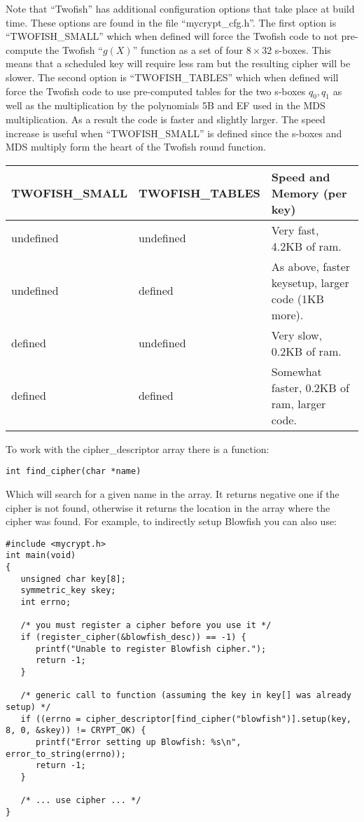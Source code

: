 \documentclass{book}
\begin{document}
Note that ``Twofish'' has additional configuration options that take place at build time.  These options are found in
the file ``mycrypt\_cfg.h''.  The first option is ``TWOFISH\_SMALL'' which when defined will force the Twofish code
to not pre-compute the Twofish ``$g(X)$'' function as a set of four $8 \times 32$ s-boxes.  This means that a scheduled
key will require less ram but the resulting cipher will be slower.  The second option is ``TWOFISH\_TABLES'' which when
defined will force the Twofish code to use pre-computed tables for the two s-boxes $q_0, q_1$ as well as the multiplication
by the polynomials 5B and EF used in the MDS multiplication.  As a result the code is faster and slightly larger.  The
speed increase is useful when ``TWOFISH\_SMALL'' is defined since the s-boxes and MDS multiply form the heart of the
Twofish round function.

\begin{small}
\begin{center}
\begin{tabular}{|l|l|l|}
\hline TWOFISH\_SMALL & TWOFISH\_TABLES & Speed and Memory (per key) \\
\hline undefined & undefined & Very fast, 4.2KB of ram. \\
\hline undefined & defined & As above, faster keysetup, larger code (1KB more). \\
\hline defined & undefined & Very slow, 0.2KB of ram. \\
\hline defined & defined & Somewhat faster, 0.2KB of ram, larger code. \\
\hline
\end{tabular}
\end{center}
\end{small}

To work with the cipher\_descriptor array there is a function:
\begin{verbatim}
int find_cipher(char *name)
\end{verbatim}
Which will search for a given name in the array.  It returns negative one if the cipher is not found, otherwise it returns
the location in the array where the cipher was found.  For example, to indirectly setup Blowfish you can also use:
\begin{small}
\begin{verbatim}
#include <mycrypt.h>
int main(void)
{
   unsigned char key[8];
   symmetric_key skey;
   int errno;

   /* you must register a cipher before you use it */
   if (register_cipher(&blowfish_desc)) == -1) {
      printf("Unable to register Blowfish cipher.");
      return -1;
   }

   /* generic call to function (assuming the key in key[] was already setup) */
   if ((errno = cipher_descriptor[find_cipher("blowfish")].setup(key, 8, 0, &skey)) != CRYPT_OK) {
      printf("Error setting up Blowfish: %s\n", error_to_string(errno));
      return -1;
   }

   /* ... use cipher ... */
}
\end{verbatim}
\end{small}
\end{document}

